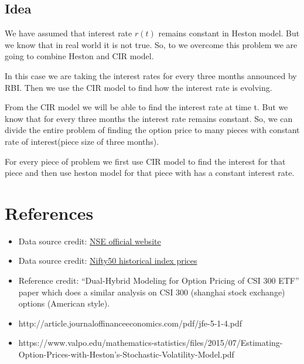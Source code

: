 \subsection{Idea}
\par We have assumed that interest rate $r(t)$ remains constant in Heston model. But we know that in real world it is not true. So, to we overcome this problem we are going to combine Heston and CIR model.

\par In this case we are taking the interest rates for every three months announced by RBI. Then we use the CIR model to find how the interest rate is evolving.

\par From the CIR model we will be able to find the interest rate at time t. But we know that for every three months the interest rate remains constant. So, we can divide the entire problem of finding the option price to many pieces with constant rate of interest(piece size of three months).

\par For every piece of problem we first use CIR model to find the interest for that piece and then use heston model for that piece with has a constant interest rate.

\section{References}
\begin{itemize}
	\item Data source credit: \href{https://www1.nseindia.com/products/content/derivatives/equities/historical_fo.htm}{NSE official website}
	\item Data source credit: \href{https://in.investing.com/indices/s-p-cnx-nifty-historical-data?interval_sec=daily}{Nifty50 historical index prices}
	\item Reference credit: “Dual-Hybrid Modeling for Option Pricing of CSI 300 ETF” paper which does a similar analysis on CSI 300 (shanghai stock exchange) options (American style).
	\item http://article.journaloffinanceeconomics.com/pdf/jfe-5-1-4.pdf
	\item https://www.valpo.edu/mathematics-statistics/files/2015/07/Estimating-Option-Prices-with-Heston’s-Stochastic-Volatility-Model.pdf
\end{itemize}
